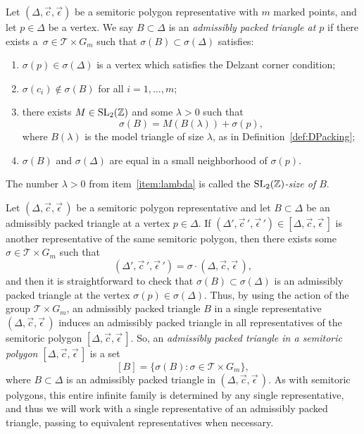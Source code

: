 \documentclass[10pt,a4paper]{amsart}
\numberwithin{equation}{section}
\def\Z{{\mathbb Z}}
\newcommand{\De}{\Delta}
\newcommand{\SL}{{\rm SL}_2(\Z)}
\newcommand{\stpoly}{[\De,\vec{c},\vec{\epsilon}\,]}
\newcommand{\strep}{(\De,\vec{c},\vec{\epsilon}\,)}
\theoremstyle{definition}
\theoremstyle{plain}
\theoremstyle{plain}
\begin{document}
\begin{Definition}\label{def:STadm-packed-triangle}
Let $(\De,\vec c, \vec \epsilon)$ be a semitoric polygon representative with $m$ marked points, and let $p\in\Delta$ be a vertex. We say $B \subset \De$ is an \emph{admissibly packed triangle at $p$} if there exists a~$\sigma \in \mathcal{T}\times G_m$ such that $\sigma(B) \subset \sigma(\De)$ satisfies:
\begin{enumerate}\itemsep=0pt
 \item[(1)] $\sigma(p)\in\sigma(\De)$ is a vertex which satisfies the Delzant corner condition;
 \item[(2)] $\sigma(c_i)\notin \sigma(B)$ for all $i=1,\ldots,m$;
 \item[(3)]\label{item:lambda} there exists $M\in\SL$ and some $\lambda>0$ such that
 \[
 \sigma(B) = M(B(\lambda)) + \sigma(p),
 \]
 where $B(\lambda)$ is the model triangle of size $\lambda$, as in Definition~\ref{def:DPacking};
 \item[(4)] $\sigma(B)$ and $\sigma(\De)$ are equal in a small neighborhood of $\sigma(p)$.
\end{enumerate}
The number $\lambda>0$ from item~\eqref{item:lambda} is called the \emph{$\SL$-size of $B$}.
\end{Definition}

Let $\strep$ be a semitoric polygon representative and let $B\subset \De$ be an admissibly packed triangle at a vertex $p\in\De$.
If $(\De',\vec{c}\,{}',\vec{\epsilon}\,{}')\in\stpoly$ is another representative of the same semitoric polygon, then there exists some $\sigma \in \mathcal{T}\times G_m$ such that
\[(\De',\vec{c}\,{}',\vec{\epsilon}\,{}' ) = \sigma \cdot \strep,\]
and then it is straightforward to check that $\sigma(B)\subset\sigma(\De)$
is an admissibly packed triangle at the vertex $\sigma(p)\in\sigma(\De)$.
Thus, by using the action of the group $\mathcal{T}\times G_m$,
an admissibly packed triangle $B$ in a single representative $\strep$ induces an admissibly packed triangle in all representatives of the semitoric polygon $\stpoly$.
So, an \emph{admissibly packed triangle in a semitoric polygon $\stpoly$} is a set
\[
 [B] = \{\sigma(B)\colon \sigma\in\mathcal{T}\times G_m\},
\]
where $B\subset \De$ is an admissibly packed triangle in $\strep$.
As with semitoric polygons, this entire infinite family is determined by any single representative, and thus we will work with a single representative of an admissibly packed triangle, passing to equivalent representatives when necessary.
\end{document}
